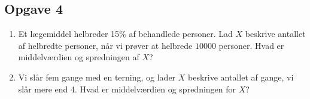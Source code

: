 \subsection*{Opgave 4}
\begin{enumerate}[label=\roman*)]
\item Et lægemiddel helbreder 15$\%$ af behandlede personer. Lad $X$ beskrive antallet af helbredte personer, når vi prøver at helbrede $10000$ personer. Hvad er middelværdien og spredningen af $X$?
\item Vi slår fem gange med en terning, og lader $X$ beskrive antallet af gange, vi slår mere end 4. Hvad er middelværdien og spredningen for $X$?
\end{enumerate}